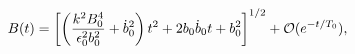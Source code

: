 \begin{equation}
B(t) = \left[\left(\frac{k^2 B_0^4}{\epsilon_0^2 b_0^2}+\dot b_0^2\right)t^2
    +2b_0\dot b_0t+b_0^2 \right]^{1/2} + {\cal O}(e^{-t/T_0}),
\end{equation}

